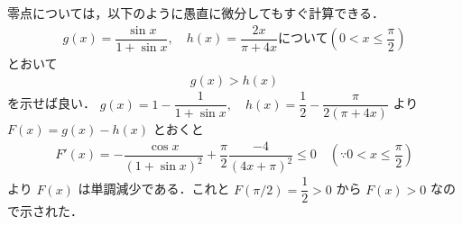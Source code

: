 \documentclass[../../main.tex]{subfiles}
\begin{document}
零点については，以下のように愚直に微分してもすぐ計算できる．
\begin{align}
  g(x) = \dfrac{\sin x}{1+\sin x}, \quad h(x) = \dfrac{2x}{\pi+4x} \text{について} \left(0 < x \le \dfrac{\pi}{2}\right)
\end{align}
とおいて
\begin{align}
  g(x) > h(x)
\end{align}
を示せば良い．
$g(x) = 1 - \dfrac{1}{1+\sin x}, \quad h(x) = \dfrac{1}{2} - \dfrac{\pi}{2(\pi+4x)}$ より
$F(x) = g(x) - h(x)$ とおくと
\begin{align}
  F'(x) = - \dfrac{\cos x}{(1+\sin x)^2} + \dfrac{\pi}{2} \dfrac{-4}{(4x+\pi)^2} \le 0 \quad \left(\because 0 < x \le \dfrac{\pi}{2}\right)
\end{align}
より $F(x)$ は単調減少である．これと $F(\pi/2) = \dfrac{1}{2} > 0$ から $F(x) > 0$ なので示された．
\end{document}
